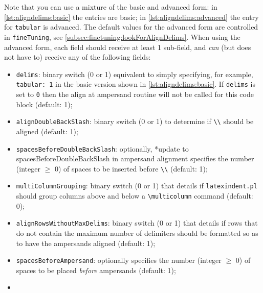  Note that you can use a mixture of the basic and advanced form: in
 \cref{lst:aligndelims:basic} the entries are basic; in \cref{lst:aligndelims:advanced}
 the entry for \texttt{tabular} is advanced.  The default values for the advanced
 form are controlled in \texttt{fineTuning}, see
 \vref{subsec:finetuning:lookForAlignDelims}. When using the advanced form, each field
 should receive at least 1 sub-field, and \emph{can} (but does not have to) receive any
 of the following fields:
 \begin{itemize}
  \item \texttt{delims}: binary switch (0 or 1) equivalent to simply specifying, for
        example, \texttt{tabular: 1} in the basic version shown in \cref{lst:aligndelims:basic}.
        If \texttt{delims} is set to \texttt{0} then the align at ampersand routine will not be
        called for this code block (default: 1);
  \item \texttt{alignDoubleBackSlash}: binary switch (0 or 1) to determine if
        \lstinline!\\!
        should be aligned (default: 1);
  \item \texttt{spacesBeforeDoubleBackSlash}: optionally,%
        *{update to spacesBeforeDoubleBackSlash in ampersand alignment}
        specifies the number (integer $\geq$ 0) of spaces to be inserted before
        \lstinline!\\! (default: 1); %
  \item {} \texttt{multiColumnGrouping}: binary
        switch (0 or 1) that details if \texttt{latexindent.pl} should group columns
        above and below a \lstinline!\multicolumn! command (default: 0);
  \item {}
        \texttt{alignRowsWithoutMaxDelims}: binary switch (0 or 1) that details if rows
        that do not contain the maximum number of delimiters should be formatted so as to
        have the ampersands aligned (default: 1);
  \item {}\texttt{spacesBeforeAmpersand}: optionally specifies the number
        (integer $\geq$ 0) of spaces to be placed \emph{before} ampersands (default: 1);
  \item {}
\end{itemize}
